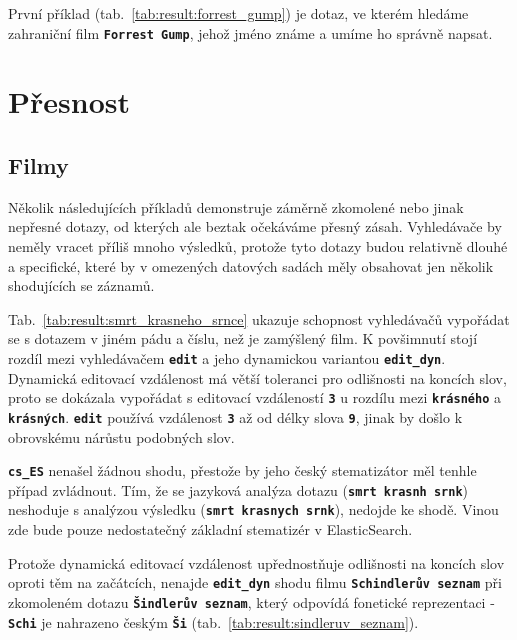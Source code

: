 \documentclass[11pt,letterpaper,oneside,openright]{book}
\newcommand{\bftt}[1]{\texttt{\textbf{#1}}}
\begin{document}
\mbox{}\mbox{}

První příklad (tab.~\ref{tab:result:forrest_gump}) je dotaz, ve kterém hledáme
zahraniční film \bftt{Forrest Gump}, jehož jméno známe a umíme ho správně
napsat.

\section{Přesnost}
\subsection{Filmy}
Několik následujících příkladů demonstruje záměrně zkomolené nebo jinak
nepřesné dotazy, od kterých ale beztak očekáváme přesný zásah.
Vyhledávače by neměly vracet příliš mnoho výsledků, protože tyto dotazy
budou relativně dlouhé a specifické, které by v omezených datových
sadách měly obsahovat jen několik shodujících se záznamů.

\mbox{}\mbox{}

Tab.~\ref{tab:result:smrt_krasneho_srnce} ukazuje schopnost vyhledávačů
vypořádat se s dotazem v jiném pádu a číslu, než je zamýšlený film. K
povšimnutí stojí rozdíl mezi vyhledávačem \bftt{edit} a jeho dynamickou
variantou \bftt{edit\_dyn}. Dynamická editovací vzdálenost má větší toleranci
pro odlišnosti na koncích slov, proto se dokázala vypořádat s editovací
vzdáleností \bftt{3} u rozdílu mezi \bftt{krásného} a \bftt{krásných}.
\bftt{edit} používá vzdálenost \bftt{3} až od délky slova \bftt{9}, jinak by
došlo k obrovskému nárůstu podobných slov.

\bftt{cs\_ES} nenašel žádnou shodu, přestože by jeho český stematizátor měl
tenhle případ zvládnout. Tím, že se jazyková analýza dotazu
(\bftt{smrt~krasnh~srnk}) neshoduje s analýzou výsledku
(\bftt{smrt~krasnych~srnk}), nedojde ke shodě. Vinou zde bude pouze
nedostatečný základní stematizér v ElasticSearch.

\mbox{}\mbox{}

Protože dynamická editovací vzdálenost upřednostňuje odlišnosti na
koncích slov oproti těm na začátcích, nenajde \bftt{edit\_dyn} shodu
filmu \bftt{Schindlerův seznam} při zkomoleném dotazu \bftt{Šindlerův
seznam}, který odpovídá fonetické reprezentaci - \bftt{Schi} je
nahrazeno českým \bftt{Ši} (tab.~\ref{tab:result:sindleruv_seznam}).

\mbox{}\mbox{}
\end{document}
